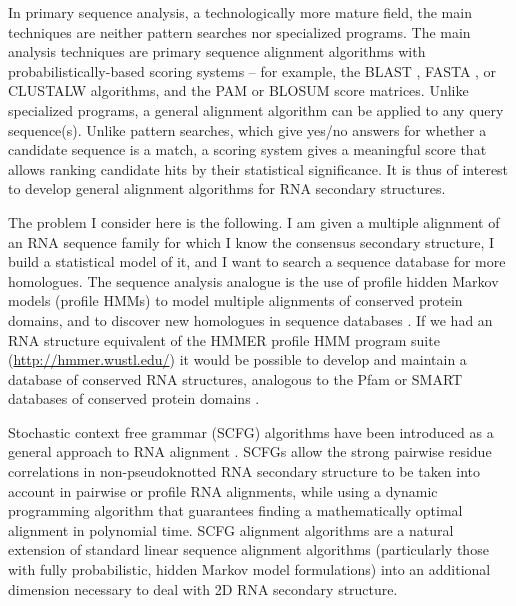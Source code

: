 \documentclass[11pt]{article}
\begin{document}
In primary sequence analysis, a technologically more mature field, the
main techniques are neither pattern searches nor specialized
programs. The main analysis techniques are primary sequence alignment
algorithms with probabilistically-based scoring systems -- for
example, the BLAST \cite{Altschul97}, FASTA \cite{Pearson88}, or
CLUSTALW \cite{Thompson94b} algorithms, and the PAM \cite{Dayhoff78}
or BLOSUM \cite{Henikoff92} score matrices. Unlike specialized
programs, a general alignment algorithm can be applied to any query
sequence(s). Unlike pattern searches, which give yes/no answers for
whether a candidate sequence is a match, a scoring system gives a
meaningful score that allows ranking candidate hits by their
statistical significance. It is thus of interest to develop general
alignment algorithms for RNA secondary structures.

The problem I consider here is the following.  I am given a multiple
alignment of an RNA sequence family for which I know the consensus
secondary structure, I build a statistical model of it, and I want to
search a sequence database for more homologues. The sequence analysis
analogue is the use of profile hidden Markov models (profile HMMs) to
model multiple alignments of conserved protein domains, and to
discover new homologues in sequence databases
\cite{Krogh94,Eddy98}. If we had an RNA structure equivalent of the
HMMER profile HMM program suite (\url{http://hmmer.wustl.edu/}) it
would be possible to develop and maintain a database of conserved RNA
structures, analogous to the Pfam or SMART databases of conserved
protein domains \cite{Bateman02,LetunikBork02}.

Stochastic context free grammar (SCFG) algorithms have been introduced
as a general approach to RNA alignment
\cite{Eddy94,Sakakibara94c,Durbin98}. SCFGs allow the strong pairwise
residue correlations in non-pseudoknotted RNA secondary structure to
be taken into account in pairwise or profile RNA alignments, while
using a dynamic programming algorithm that guarantees finding a
mathematically optimal alignment in polynomial time. SCFG alignment
algorithms are a natural extension of standard linear sequence
alignment algorithms (particularly those with fully probabilistic,
hidden Markov model formulations) into an additional dimension
necessary to deal with 2D RNA secondary structure.
\end{document}
